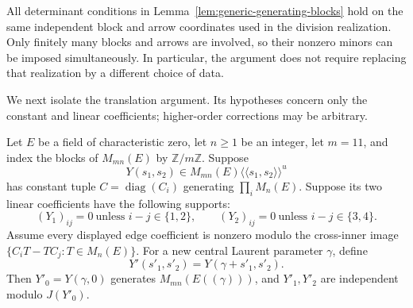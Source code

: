 All determinant conditions in Lemma~\ref{lem:generic-generating-blocks}
hold on the same independent block and arrow coordinates used in
the division realization.  Only finitely many blocks and arrows are
involved, so their nonzero minors can be imposed simultaneously.
In particular, the argument does not require replacing that realization
by a different choice of data.

We next isolate the translation argument.  Its hypotheses concern
only the constant and linear coefficients; higher-order corrections
may be arbitrary.

\begin{lemma}
\label{lem:translation-two-directions}
Let $E$ be a field of characteristic zero, let $n\ge1$ be an integer,
let $m=11$, and index
the blocks of $M_{mn}(E)$ by $\mathbb Z/m\mathbb Z$.
Suppose
\[
 Y(s_1,s_2)\in M_{mn}(E)
       \langle\!\langle s_1,s_2\rangle\!\rangle^u
\]
has constant tuple $C=\operatorname{diag}(C_i)$ generating
$\prod_iM_n(E)$.  Suppose its two linear coefficients have the
following supports:
\[
 (Y_1)_{ij}=0\ \text{unless }i-j\in\{1,2\},
 \qquad
 (Y_2)_{ij}=0\ \text{unless }i-j\in\{3,4\}.
\]
Assume every displayed edge coefficient is nonzero modulo the
cross-inner image $\{C_iT-TC_j:T\in M_n(E)\}$.
For a new central Laurent parameter $\gamma$, define
\[
 Y'(s'_1,s'_2)=Y(\gamma+s'_1,s'_2).
\]
Then $Y'_0=Y(\gamma,0)$ generates $M_{mn}(E((\gamma)))$, and
$Y'_1,Y'_2$ are independent modulo $J(Y'_0)$.
\end{lemma}

